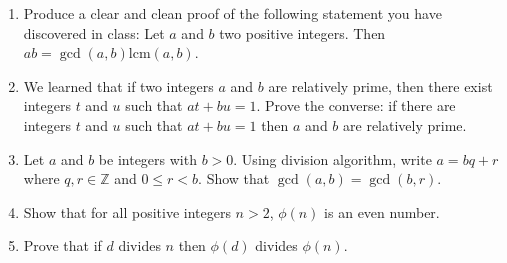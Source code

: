 \documentclass[11pt]{article}
\theoremstyle{definition}  %
\newcommand{\Z}{\mathbb{Z}}
\newcommand{\lcm}{\mathrm{lcm}}
\begin{document}

\begin{enumerate}

\item Produce a clear and clean proof of the following statement you have discovered in class:  Let $a$ and $b$ two positive integers. Then
$ab = \gcd(a,b) \lcm(a,b)$. 
\item We learned that if two integers $a$ and $b$ are relatively prime, then there exist integers $t$ and $u$ such that $at + bu = 1$.
Prove the converse: if there are integers $t$ and $u$ such that $at + bu = 1$ then $a$ and $b$ are relatively prime. 
\item Let $a$ and $b$ be integers with $b >0$. Using division algorithm, write $a = bq + r$ where $q, r \in \Z$ and $0 \leq r < b$. Show that $\gcd(a,b) = \gcd(b, r)$.
\item Show that for all positive integers $n > 2$, $\phi(n)$ is an even number. 
\item Prove that if $d$ divides $n$ then $\phi(d)$ divides $\phi(n)$. 


 \end{enumerate}
\end{document}

